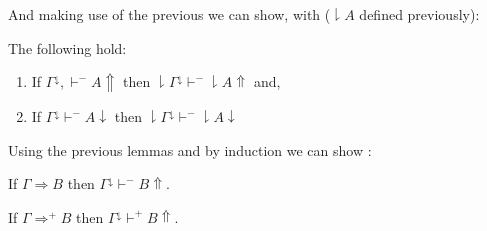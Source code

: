 						And making use of the previous we can show, with ($\downharpoonright A$ defined previously):
						\begin{lemma}
							The following hold:
							\begin{enumerate}
								\item If $\Gamma^\downarrow,\vdash^{-}  A\Uparrow$ then $\downharpoonright\Gamma^\downarrow\vdash^{-} \downharpoonright A\Uparrow$   and,
								\item If $\Gamma^\downarrow\vdash^{-} A\downarrow$ then  $\downharpoonright\Gamma^\downarrow\vdash^{-} \downharpoonright A\downarrow$   
							\end{enumerate}
						\end{lemma}
						Using the previous lemmas and by induction we can show :
						\begin{theorem} 
							\label{soundnseq}
							If   $\Gamma\Rightarrow B$ then $\Gamma^\downarrow\vdash^{-} B\Uparrow$.
							
							
						\end{theorem}
						\begin{theorem} 
							
							If   $\Gamma\Rightarrow^{+} B$ then $\Gamma^\downarrow\vdash^{+} B\Uparrow$.
						\end{theorem}
						
